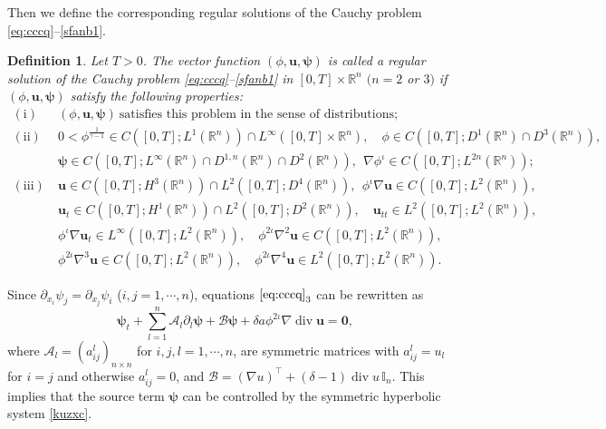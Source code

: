 \documentclass[11pt,reqno]{amsart}
\DeclareMathOperator{\diver}{\mathrm{div}}
\newtheorem{mydef}{Definition}
\numberwithin{rk}{section}
\numberwithin{prop}{section}
\numberwithin{mydef}{section}
\numberwithin{lem}{section}
\numberwithin{equation}{section}
\numberwithin{thm}{section}
\begin{document}
Then we define the corresponding regular solutions of the Cauchy problem \eqref{eq:cccq}--\eqref{sfanb1}.
\begin{mydef}\label{cjk-reform}
Let $T>0$. The vector function $(\phi, \boldsymbol{u},\boldsymbol{\psi})$ is called a regular solution of the Cauchy problem \eqref{eq:cccq}{\rm--}\eqref{sfanb1}  in $[0,T]\times \mathbb{R}^n$ $(n=2$ or $3)$ if $(\phi, \boldsymbol{u},\boldsymbol{\psi})$ satisfy the following properties{\rm:}
\begin{equation*}\begin{aligned}
\mathrm{(i)}& \ (\phi, \boldsymbol{u},\boldsymbol{\psi}) \ \text{satisfies this problem in the sense of distributions};\\
\mathrm{(ii)}& \ 0<\phi^\frac{1}{\gamma-1}\in C([0,T];L^1(\mathbb{R}^n))\cap L^\infty([0,T]\times \mathbb{R}^n), 
\quad   \phi \in C([0,T]; D^1(\mathbb{R}^n)\cap D^3(\mathbb{R}^n)),\\[2pt]
& \ \boldsymbol{\psi}\in C([0,T]; L^\infty(\mathbb{R}^n)\cap D^{1,n}(\mathbb{R}^n)\cap D^2(\mathbb{R}^n)),\ \ \nabla\phi^\iota\in C([0,T]; L^{2n}(\mathbb{R}^n));\\[2pt]
\mathrm{(iii)}& \ \boldsymbol{u}\in C([0,T]; H^3(\mathbb{R}^n))\cap L^2([0,T]; D^{4}(\mathbb{R}^n)),\ \  \phi^{\iota}\nabla \boldsymbol{u} \in C([0,T]; L^2(\mathbb{R}^n)),\\[2pt]
& \ \boldsymbol{u}_t\in C([0,T]; H^1(\mathbb{R}^n))\cap L^2([0,T]; D^2(\mathbb{R}^n)),\quad    \boldsymbol{u}_{tt} \in L^2([0,T]; L^2(\mathbb{R}^n)), \\[2pt]
& \ \phi^\iota\nabla \boldsymbol{u}_t \in  L^\infty([0,T];L^2(\mathbb{R}^n)),\quad   \phi^{2\iota}\nabla^2 \boldsymbol{u} \in C([0,T]; L^2(\mathbb{R}^n)),\\[2pt] 
& \ \phi^{2\iota}\nabla^3 \boldsymbol{u} \in C([0,T]; L^2(\mathbb{R}^n)),\quad \phi^{2\iota}\nabla^4 \boldsymbol{u} \in L^2([0,T]; L^2(\mathbb{R}^n)).
\end{aligned}
\end{equation*}
\end{mydef}

Since $\partial_{x_i} \psi_j=\partial_{x_j} \psi_i$ ($i,j=1,\cdots\!,n$), equations $\eqref{eq:cccq}_3$ can be rewritten as
\begin{equation}\label{kuzxc}
\boldsymbol{\psi}_t+\sum_{l=1}^n \mathcal{A}_l \partial_l\boldsymbol{\psi}+\mathcal{B}\boldsymbol{\psi}+\delta a\phi^{2\iota}\nabla \diver \boldsymbol{u}=\boldsymbol{0},
\end{equation}
where $\mathcal{A}_l=(a^l_{ij})_{n\times n}$ for  $i,j,l=1,\cdots\!,n$,
are symmetric matrices with $a^l_{ij}=u_l$ for $i=j$ and otherwise $a^l_{ij}=0$,  and $\mathcal{B}=(\nabla u)^\top+(\delta-1)\diver u\,\mathbb{I}_n$. This implies that the source term $\boldsymbol{\psi}$ can be controlled by the symmetric hyperbolic system \eqref{kuzxc}.
\end{document}
